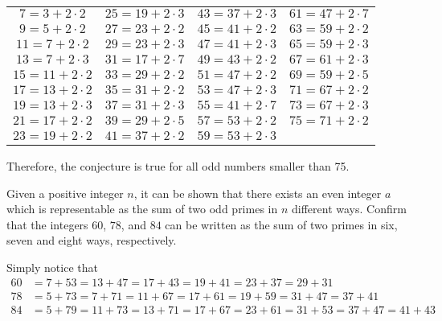 \begin{solution}
    \begin{center}
    \begin{tabular}{cccc}
        $7 = 3 + 2\cdot 2$ & $25 = 19 + 2\cdot 3$ & $43 = 37 + 2\cdot 3$ & $61 = 47 + 2\cdot 7$ \\
        $9 = 5 + 2\cdot 2$ & $27 = 23 + 2\cdot 2$ & $45 = 41 + 2\cdot 2$ & $63 = 59 + 2\cdot 2$ \\
        $11 = 7 + 2\cdot 2$ & $29 = 23 + 2\cdot 3$ & $47 = 41 + 2\cdot 3$ & $65 = 59 + 2\cdot 3$ \\
        $13 = 7 + 2\cdot 3$ & $31 = 17 + 2\cdot 7$ & $49 = 43 + 2\cdot 2$ & $67 = 61 + 2\cdot 3$ \\
        $15 = 11 + 2\cdot 2$ & $33 = 29 + 2\cdot 2$ & $51 = 47 + 2\cdot 2$ & $69 = 59 + 2\cdot 5$ \\
        $17 = 13 + 2\cdot 2$ & $35 = 31 + 2\cdot 2$ & $53 = 47 + 2 \cdot 3$ &$71 = 67 + 2\cdot 2$ \\
        $19 = 13 + 2\cdot 3$ & $37 = 31 + 2\cdot 3$ & $55 = 41 + 2\cdot 7$ & $73 = 67 + 2\cdot 3$ \\
        $21 = 17 + 2\cdot 2$ & $39 = 29 + 2\cdot 5$ & $57 = 53 + 2\cdot 2$ & $75 = 71 + 2\cdot 2$ \\
        $23 = 19 + 2\cdot 2$ & $41 = 37 + 2\cdot 2$ & $59 = 53 + 2\cdot 3$ & \\
    \end{tabular}
    \end{center}
    Therefore, the conjecture is true for all odd numbers smaller than 75.\\
\end{solution}

\begin{exercise}
    Given a positive integer $n$, it can be shown that there exists an even integer $a$ which is representable as the sum of two odd primes in $n$ different ways. Confirm that the integers $60$, $78$, and $84$ can be written as the sum of two primes in six, seven and eight ways, respectively. \\
\end{exercise}

\begin{solution}
    Simply notice that
    \begin{align*}
        60 &= 7 + 53 = 13 + 47 = 17 + 43 = 19 + 41 = 23 + 37 = 29 + 31\\
        78 &= 5 + 73 = 7 + 71 = 11 + 67 = 17 + 61 = 19 + 59 = 31 + 47 = 37 + 41\\
        84 &= 5 + 79 = 11 + 73 = 13 + 71 = 17 + 67 = 23 + 61 = 31 + 53 = 37 + 47 = 41 + 43 \\
    \end{align*}
\end{solution}

